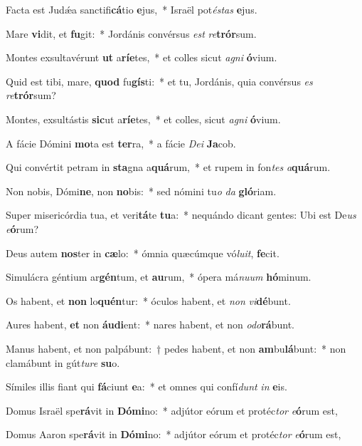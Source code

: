 \item Facta est Judǽa sanctifi\textbf{cá}tio \textbf{e}jus,~* Israël pot\textit{és}\textit{tas} \textbf{e}jus.
\item Mare \textbf{vi}dit, et \textbf{fu}git:~* Jordánis convérsus \textit{est} \textit{re}\textbf{trór}sum.
\item Montes exsultavérunt \textbf{ut} a\textbf{rí}\textbf{e}tes,~* et colles sicut \textit{a}\textit{gni} \textbf{ó}vium.
\item Quid est tibi, mare, \textbf{quod} fu\textbf{gís}ti:~* et tu, Jordánis, quia convérsus \textit{es} \textit{re}\textbf{trór}sum?
\item Montes, exsultástis \textbf{sic}ut a\textbf{rí}\textbf{e}tes,~* et colles, sicut \textit{a}\textit{gni} \textbf{ó}vium.
\item A fácie Dómini \textbf{mo}ta est \textbf{ter}ra,~* a fácie \textit{De}\textit{i} \textbf{Ja}cob.
\item Qui convértit petram in \textbf{sta}gna a\textbf{quá}rum,~* et rupem in fon\textit{tes} \textit{a}\textbf{quá}rum.
\item Non nobis, Dómi\textbf{ne}, non \textbf{no}bis:~* sed nómini tu\textit{o} \textit{da} \textbf{gló}riam.
\item Super misericórdia tua, et veri\textbf{tá}te \textbf{tu}a:~* nequándo dicant gentes: Ubi est De\textit{us} \textit{e}\textbf{ó}rum?
\item Deus autem \textbf{nos}ter in \textbf{cæ}lo:~* ómnia quæcúmque vó\textit{lu}\textit{it}, \textbf{fe}cit.
\item Simulácra géntium ar\textbf{gén}tum, et \textbf{au}rum,~* ópera má\textit{nu}\textit{um} \textbf{hó}minum.
\item Os habent, et \textbf{non} lo\textbf{quén}tur:~* óculos habent, et \textit{non} \textit{vi}\textbf{dé}bunt.
\item Aures habent, \textbf{et} non \textbf{áu}\textbf{di}ent:~* nares habent, et non \textit{o}\textit{do}\textbf{rá}bunt.
\item Manus habent, et non palpábunt:~† pedes habent, et non \textbf{am}bu\textbf{lá}bunt:~* non clamábunt in gút\textit{tu}\textit{re} \textbf{su}o.
\item Símiles illis fiant qui \textbf{fá}ciunt \textbf{e}a:~* et omnes qui confí\textit{dunt} \textit{in} \textbf{e}is.
\item Domus Israël spe\textbf{rá}vit in \textbf{Dó}\textbf{mi}no:~* adjútor eórum et protéc\textit{tor} \textit{e}\textbf{ó}rum est,
\item Domus Aaron spe\textbf{rá}vit in \textbf{Dó}\textbf{mi}no:~* adjútor eórum et protéc\textit{tor} \textit{e}\textbf{ó}rum est,
